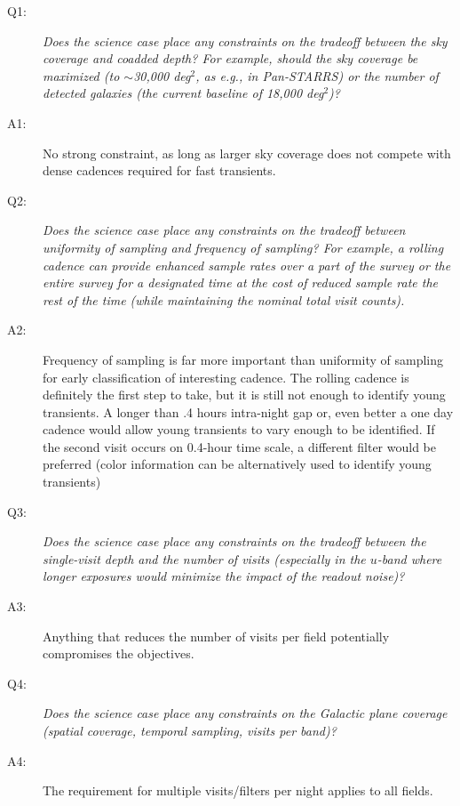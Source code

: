  \begin{description}

 \item[Q1:] {\it Does the science case place any constraints on the
 tradeoff between the sky coverage and coadded depth? For example, should
 the sky coverage be maximized (to $\sim$30,000 deg$^2$, as e.g., in
 Pan-STARRS) or the number of detected galaxies (the current baseline
 of 18,000 deg$^2$)?}

 \item[A1:] No strong constraint, as long as larger sky coverage does not compete with dense cadences
required for fast transients.

 \item[Q2:] {\it Does the science case place any constraints on the
 tradeoff between uniformity of sampling and frequency of  sampling? For
 example, a rolling cadence can provide enhanced sample rates over a part
 of the survey or the entire survey for a designated time at the cost of
 reduced sample rate the rest of the time (while maintaining the nominal
 total visit counts).}

 \item[A2:] Frequency of sampling is far more important than uniformity of sampling for early classification of interesting cadence. The rolling cadence is definitely the first step to take, but it is still not enough to identify young transients. A longer than .4 hours intra-night gap or, even better a one day cadence would allow young transients to vary enough to be identified. If the second visit occurs on 0.4-hour time scale, a different filter would be preferred (color information can be alternatively used to identify young transients)


 \item[Q3:] {\it Does the science case place any constraints on the
 tradeoff between the single-visit depth and the number of visits
 (especially in the $u$-band where longer exposures would minimize the
 impact of the readout noise)?}

 \item[A3:] Anything that reduces the number of visits per field potentially compromises the objectives.

 \item[Q4:] {\it Does the science case place any constraints on the
 Galactic plane coverage (spatial coverage, temporal sampling, visits per
 band)?}

 \item[A4:] The requirement for multiple visits/filters per night applies to all fields.


\end{description}
